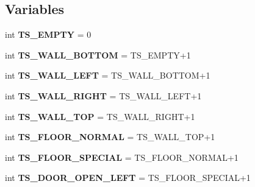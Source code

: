 \subsection*{Variables}
\begin{DoxyCompactItemize}
\item 
\hypertarget{namespaceconstants_ab193b8283e65bba7a6733878d9a6ddf4}{}int {\bfseries T\+S\+\_\+\+E\+M\+P\+T\+Y} = 0\label{namespaceconstants_ab193b8283e65bba7a6733878d9a6ddf4}

\item 
\hypertarget{namespaceconstants_a0d48a83ffd51c3dbbc7ec2aa4e086bae}{}int {\bfseries T\+S\+\_\+\+W\+A\+L\+L\+\_\+\+B\+O\+T\+T\+O\+M} = T\+S\+\_\+\+E\+M\+P\+T\+Y+1\label{namespaceconstants_a0d48a83ffd51c3dbbc7ec2aa4e086bae}

\item 
\hypertarget{namespaceconstants_a022621f7dae419031e6c893242994349}{}int {\bfseries T\+S\+\_\+\+W\+A\+L\+L\+\_\+\+L\+E\+F\+T} = T\+S\+\_\+\+W\+A\+L\+L\+\_\+\+B\+O\+T\+T\+O\+M+1\label{namespaceconstants_a022621f7dae419031e6c893242994349}

\item 
\hypertarget{namespaceconstants_af1a5e68d68187b364252ef02bc2904cc}{}int {\bfseries T\+S\+\_\+\+W\+A\+L\+L\+\_\+\+R\+I\+G\+H\+T} = T\+S\+\_\+\+W\+A\+L\+L\+\_\+\+L\+E\+F\+T+1\label{namespaceconstants_af1a5e68d68187b364252ef02bc2904cc}

\item 
\hypertarget{namespaceconstants_aa4da0c16e1610267f54e4ef7dc868065}{}int {\bfseries T\+S\+\_\+\+W\+A\+L\+L\+\_\+\+T\+O\+P} = T\+S\+\_\+\+W\+A\+L\+L\+\_\+\+R\+I\+G\+H\+T+1\label{namespaceconstants_aa4da0c16e1610267f54e4ef7dc868065}

\item 
\hypertarget{namespaceconstants_a9a18131b4b848f12fdbc38254b713f21}{}int {\bfseries T\+S\+\_\+\+F\+L\+O\+O\+R\+\_\+\+N\+O\+R\+M\+A\+L} = T\+S\+\_\+\+W\+A\+L\+L\+\_\+\+T\+O\+P+1\label{namespaceconstants_a9a18131b4b848f12fdbc38254b713f21}

\item 
\hypertarget{namespaceconstants_a6a89ae5e26ca82524d1d18d57deabdc7}{}int {\bfseries T\+S\+\_\+\+F\+L\+O\+O\+R\+\_\+\+S\+P\+E\+C\+I\+A\+L} = T\+S\+\_\+\+F\+L\+O\+O\+R\+\_\+\+N\+O\+R\+M\+A\+L+1\label{namespaceconstants_a6a89ae5e26ca82524d1d18d57deabdc7}

\item 
\hypertarget{namespaceconstants_aede8d0e044dd1e82d7cae2e3ff52b961}{}int {\bfseries T\+S\+\_\+\+D\+O\+O\+R\+\_\+\+O\+P\+E\+N\+\_\+\+L\+E\+F\+T} = T\+S\+\_\+\+F\+L\+O\+O\+R\+\_\+\+S\+P\+E\+C\+I\+A\+L+1\label{namespaceconstants_aede8d0e044dd1e82d7cae2e3ff52b961}


\end{DoxyCompactItemize}
